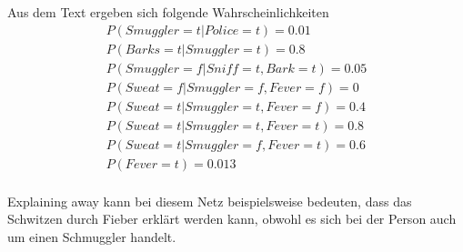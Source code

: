 \documentclass[a4paper,11pt,fleqn]{scrartcl}
\begin{document}
Aus dem Text ergeben sich folgende Wahrscheinlichkeiten
\begin{align*}
P(Smuggler= t \vert Police=t) = 0.01\\
 P(Barks= t \vert Smuggler=t) = 0.8\\
 P(Smuggler = f \vert Sniff = t, Bark = t)  = 0.05\\
 P(Sweat = f \vert Smuggler = f, Fever = f) = 0\\
 P(Sweat = t \vert Smuggler = t, Fever = f) = 0.4\\
 P(Sweat = t \vert Smuggler = t, Fever = t) = 0.8\\
 P(Sweat = t \vert Smuggler = f, Fever = t) = 0.6\\
 P(Fever = t) = 0.013\\
\end{align*}

Explaining away kann bei diesem Netz beispielsweise bedeuten, dass das Schwitzen durch Fieber erklärt werden kann, obwohl es sich bei der Person auch um einen Schmuggler handelt. 
\end{document}
